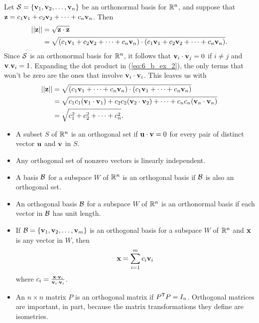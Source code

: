 \begin{example}
\item Let $\mathcal{S} = \{\mathbf{v}_1, \mathbf{v}_2, \ldots, \mathbf{v}_n\}$ be an orthonormal basis for $\mathbb{R}^n$, and suppose that $\mathbf{z} = c_1\mathbf{v}_1 + c_2 \mathbf{v}_2 + \cdots + c_n \mathbf{v}_n$. Then
\begin{align}
|| \mathbf{z} || &= \sqrt{\mathbf{z} \cdot \mathbf{z}} \notag  \\
	&= \sqrt{ (c_1\mathbf{v}_1 + c_2 \mathbf{v}_2 + \cdots + c_n \mathbf{v}_n) \cdot (c_1\mathbf{v}_1 + c_2 \mathbf{v}_2 + \cdots + c_n \mathbf{v}_n)}. \label{eq:6_b_ex_2}
\end{align}
Since $\mathcal{S}$ is an orthonormal basis for $\mathbb{R}^n$, it follows that $\mathbf{v}_i \cdot \mathbf{v}_j = 0$ if $i \neq j$ and $\mathbf{v}_ \cdot \mathbf{v}_i = 1$. Expanding the dot product in (\ref{eq:6_b_ex_2}), the only terms that won't be zero are the ones that involve $\mathbf{v}_i \cdot \mathbf{v}_i$. This leaves us with 
\begin{align*}
|| \mathbf{z} || &=  \sqrt{ (c_1\mathbf{v}_1 + \cdots + c_n \mathbf{v}_n) \cdot (c_1\mathbf{v}_1 + \cdots + c_n \mathbf{v}_n)} \\
	&= \sqrt{c_1c_1 (\mathbf{v}_1 \cdot \mathbf{v}_1) + c_2c_2 (\mathbf{v}_2 \cdot \mathbf{v}_2) + \cdots + c_nc_n (\mathbf{v}_n \cdot \mathbf{v}_n)} \\
	&= \sqrt{c_1^2+c_2^2 + \cdots + c_n^2}.
\end{align*}


\ea

\end{example}

\begin{itemize}
\item A subset $S$ of $\mathbb{R}^n$ is an orthogonal set if $\mathbf{u} \cdot \mathbf{v} = 0$ for every pair of distinct vector $\mathbf{u}$ and $\mathbf{v}$ in $S$.
\item Any orthogonal set of nonzero vectors is linearly independent. 
\item A basis $\mathcal{B}$ for a subspace $W$ of $\mathbb{R}^n$ is an orthogonal basis if $\mathcal{B}$ is also an orthogonal set.
\item An orthogonal basis $\mathcal{B}$ for a subspace $W$ of $\mathbb{R}^n$ is an orthonormal basis if each vector in $\mathcal{B}$ has unit length.
\item If $\mathcal{B} = \{\mathbf{v}_1, \mathbf{v}_2, \ldots, \mathbf{v}_m\}$ is an orthogonal basis for a subspace $W$ of $\mathbb{R}^n$ and $\mathbf{x}$ is any vector in $W$, then
\[\mathbf{x} = \sum_{i=1}^m c_i \mathbf{v}_i\]
where $c_i = \frac{\mathbf{x} \cdot \mathbf{v}_i}{\mathbf{v}_i \cdot \mathbf{v}_i}$.
\item An $n \times n$ matrix $P$ is an orthogonal matrix if $P^{\mathsf{T}}P = I_n$. Orthogonal matrices are important, in part, because the matrix transformations they define are isometries. 
\end{itemize}


